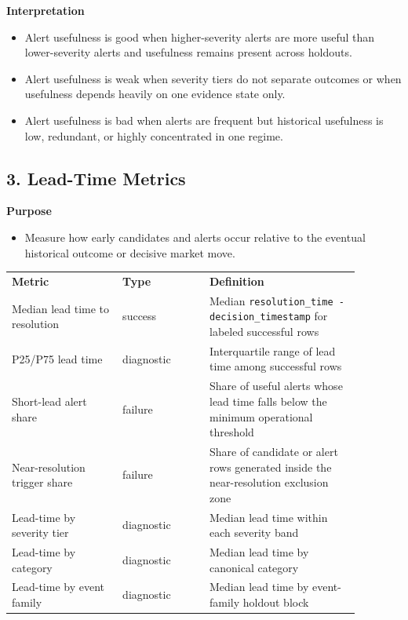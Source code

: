 \documentclass{article}
\begin{document}
\textbf{Interpretation}
\begin{itemize}
\item Alert usefulness is good when higher-severity alerts are more useful than lower-severity alerts and usefulness remains present across holdouts.
\item Alert usefulness is weak when severity tiers do not separate outcomes or when usefulness depends heavily on one evidence state only.
\item Alert usefulness is bad when alerts are frequent but historical usefulness is low, redundant, or highly concentrated in one regime.
\end{itemize}

\subsection*{3. Lead-Time Metrics}

\textbf{Purpose}
\begin{itemize}
\item Measure how early candidates and alerts occur relative to the eventual historical outcome or decisive market move.
\end{itemize}

\begin{longtable}{p{0.28\linewidth}p{0.22\linewidth}p{0.38\linewidth}}
\textbf{Metric} & \textbf{Type} & \textbf{Definition} \\
Median lead time to resolution & success & Median \texttt{resolution\_time - decision\_timestamp} for labeled successful rows \\
P25/P75 lead time & diagnostic & Interquartile range of lead time among successful rows \\
Short-lead alert share & failure & Share of useful alerts whose lead time falls below the minimum operational threshold \\
Near-resolution trigger share & failure & Share of candidate or alert rows generated inside the near-resolution exclusion zone \\
Lead-time by severity tier & diagnostic & Median lead time within each severity band \\
Lead-time by category & diagnostic & Median lead time by canonical category \\
Lead-time by event family & diagnostic & Median lead time by event-family holdout block \\
\end{longtable}
\end{document}
